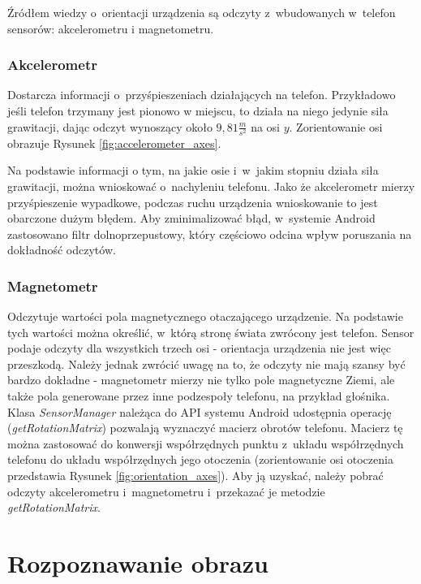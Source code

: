 \documentclass[a4paper,twocolumn,11pt]{article}
\begin{document}
Źródłem wiedzy o~orientacji urządzenia są odczyty z~wbudowanych w~telefon sensorów: akcelerometru i magnetometru.

\subsubsection{Akcelerometr}
 Dostarcza informacji o~przyśpieszeniach działających na telefon.
 Przykładowo jeśli telefon trzymany jest pionowo w miejscu, to działa na niego jedynie siła grawitacji, dając odczyt wynoszący około $9,81\frac{m}{s^2}$ na osi $y$.
 Zorientowanie osi obrazuje Rysunek \ref{fig:accelerometer_axes}.
 
 

 Na podstawie informacji o tym, na jakie osie i~w~jakim stopniu działa siła grawitacji, można wnioskować o~nachyleniu telefonu.
 Jako że akcelerometr mierzy przyśpieszenie wypadkowe, podczas ruchu urządzenia wnioskowanie to jest obarczone dużym błędem.
 Aby zminimalizować błąd, w~systemie Android zastosowano filtr dolnoprzepustowy, który częściowo odcina wpływ poruszania na dokładność odczytów.

\subsubsection{Magnetometr}
 Odczytuje wartości pola magnetycznego otaczającego urządzenie.
 Na podstawie tych wartości można określić, w~którą stronę świata zwrócony jest telefon.
 Sensor podaje odczyty dla wszystkich trzech osi - orientacja urządzenia nie jest więc przeszkodą.
 Należy jednak zwrócić uwagę na to, że odczyty nie mają szansy być bardzo dokładne - magnetometr mierzy nie tylko pole magnetyczne Ziemi, ale także pola generowane przez inne podzespoły telefonu, na przykład głośnika.\\

 Klasa \emph{SensorManager} należąca do API systemu Android udostępnia operację (\emph{getRotationMatrix}) pozwalają wyznaczyć macierz obrotów telefonu.
 Macierz tę można zastosować do konwersji współrzędnych punktu z~układu współrzędnych telefonu do układu współrzędnych jego otoczenia (zorientowanie osi otoczenia przedstawia Rysunek \ref{fig:orientation_axes}).
 Aby ją uzyskać, należy pobrać odczyty akcelerometru i~magnetometru i~przekazać je metodzie \emph{getRotationMatrix}.

 



\section{Rozpoznawanie obrazu}
\end{document}
